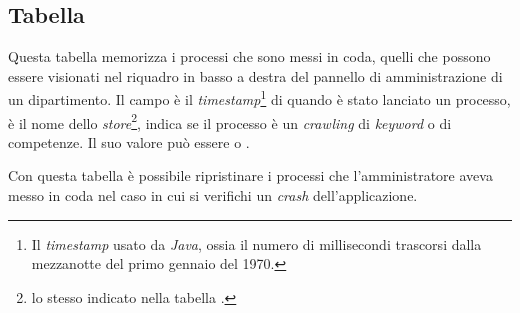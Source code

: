 \documentclass[tesi.tex]{subfiles}
\begin{document}
\subsection{Tabella }
\begin{center}
\end{center}
Questa tabella memorizza i processi che sono messi in coda, quelli che
possono essere visionati nel riquadro in basso a destra del pannello
di amministrazione di un dipartimento. Il campo
 \`e il \emph{timestamp}\footnote{Il
  \emph{timestamp} usato da \emph{Java}, ossia il numero di
  millisecondi trascorsi dalla mezzanotte del primo gennaio del 1970.}
di quando \`e stato lanciato un processo,
 \`e il nome dello \emph{store}\footnote{lo stesso indicato
nella tabella .},  indica se il processo
\`e un \emph{crawling} di \emph{keyword} o di competenze. Il suo
valore pu\`o essere  o .

Con questa tabella \`e possibile ripristinare i processi che
l'amministratore aveva messo in coda nel caso in cui si verifichi un
\emph{crash} dell'applicazione.
\end{document}
